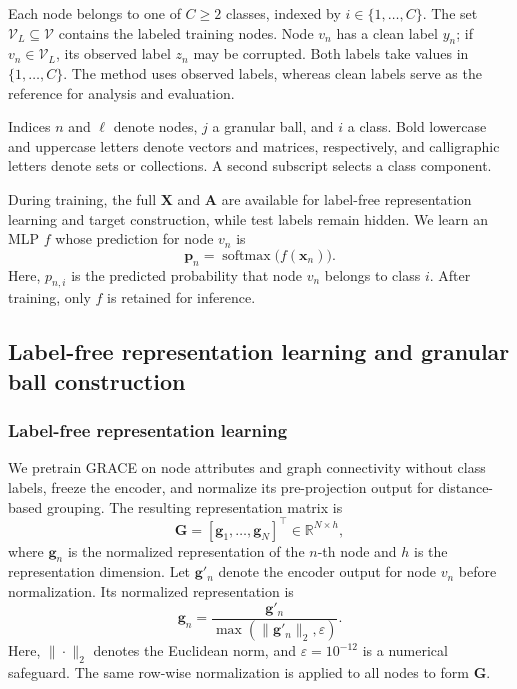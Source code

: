 \documentclass[times,review,10pt]{elsarticle}
\theoremstyle{definition}
\theoremstyle{plain}
\begin{document}
Each node belongs to one of \(C\geq2\) classes, indexed by \(i\in\{1,\ldots,C\}\). The set \(\mathcal V_L\subseteq\mathcal V\) contains the labeled training nodes. Node \(v_n\) has a clean label \(y_n\); if \(v_n\in\mathcal V_L\), its observed label \(z_n\) may be corrupted. Both labels take values in \(\{1,\ldots,C\}\). The method uses observed labels, whereas clean labels serve as the reference for analysis and evaluation.

Indices \(n\) and \(\ell\) denote nodes, \(j\) a granular ball, and \(i\) a class. Bold lowercase and uppercase letters denote vectors and matrices, respectively, and calligraphic letters denote sets or collections. A second subscript selects a class component.


During training, the full \(\mathbf X\) and \(\mathbf A\) are available for label-free representation learning and target construction, while test labels remain hidden. We learn an MLP \(f\) whose prediction for node \(v_n\) is
\begin{equation}\label{eq:1}
\mathbf p_n=\operatorname{softmax}\bigl(f(\mathbf x_n)\bigr).
\end{equation}
Here, \(p_{n,i}\) is the predicted probability that node \(v_n\) belongs to class \(i\). After training, only \(f\) is retained for inference.

\subsection{Label-free representation learning and granular ball construction}\label{sec:3.2}

\subsubsection{Label-free representation learning}\label{sec:3.2.1}

We pretrain GRACE \cite{ref12} on node attributes and graph connectivity without class labels, freeze the encoder, and normalize its pre-projection output for distance-based grouping. The resulting representation matrix is
\begin{equation}\label{eq:2}
\mathbf G=[\mathbf g_1,\ldots,\mathbf g_N]^\top\in\mathbb R^{N\times h},
\end{equation}
where \(\mathbf g_n\) is the normalized representation of the \(n\)-th node and \(h\) is the representation dimension. Let \(\mathbf g'_n\) denote the encoder output for node \(v_n\) before normalization. Its normalized representation is
\begin{equation}\label{eq:3}
\mathbf g_n=\frac{\mathbf g'_n}{\max(\|\mathbf g'_n\|_2,\varepsilon)}.
\end{equation}
Here, \(\|\cdot\|_2\) denotes the Euclidean norm, and \(\varepsilon=10^{-12}\) is a numerical safeguard. The same row-wise normalization is applied to all nodes to form \(\mathbf G\).
\end{document}
